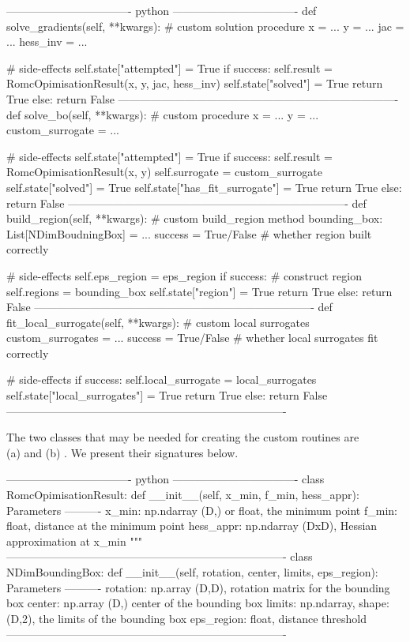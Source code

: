 \begin{Code}
---------------------------------- python ----------------------------------
def solve_gradients(self, **kwargs):
  # custom solution procedure
  x = ...
  y = ...
  jac = ...
  hess_inv = ...
  
  # side-effects
  self.state["attempted"] = True
  if success:
    self.result = RomcOpimisationResult(x, y, jac, hess_inv)
    self.state["solved"] = True
    return True
  else:
    return False
----------------------------------------------------------------------------
def solve_bo(self, **kwargs):
  # custom procedure
  x = ...
  y = ...
  custom_surrogate = ...
  
  # side-effects
  self.state["attempted"] = True
  if success:
    self.result = RomcOpimisationResult(x, y)
    self.surrogate = custom_surrogate
    self.state["solved"] = True
    self.state["has_fit_surrogate"] = True
    return True
  else:
    return False
----------------------------------------------------------------------------
def build_region(self, **kwargs):
  # custom build_region method
  bounding_box: List[NDimBoudningBox] = ...
  success = True/False # whether region built correctly

  # side-effects
  self.eps_region = eps_region
  if success:
    # construct region
    self.regions = bounding_box
    self.state["region"] = True
    return True
  else:
    return False
----------------------------------------------------------------------------
def fit_local_surrogate(self, **kwargs):
  # custom local surrogates
  custom_surrogates = ...
  success = True/False # whether local surrogates fit correctly

  # side-effects
  if success:
    self.local_surrogate = local_surrogates
    self.state["local_surrogates"] = True
    return True
  else:
    return False
----------------------------------------------------------------------------    
\end{Code}

The two classes that may be needed for creating the custom routines
are \\ (a)  and (b)
. We present their signatures below.

\begin{Code}
---------------------------------- python ----------------------------------
class RomcOpimisationResult:
    def __init__(self, x_min, f_min, hess_appr):
        Parameters
        ----------
        x_min: np.ndarray (D,) or float, the minimum point
        f_min: float, distance at the minimum point
        hess_appr: np.ndarray (DxD), Hessian approximation at x_min
        """
----------------------------------------------------------------------------    
class NDimBoundingBox:
    def __init__(self, rotation, center, limits, eps_region):
        Parameters
        ----------
        rotation: np.array (D,D),  rotation matrix for the bounding box
        center: np.array (D,) center of the bounding box
        limits: np.ndarray, shape: (D,2), the limits of the bounding box
        eps_region: float, distance threshold 
----------------------------------------------------------------------------    
\end{Code}

